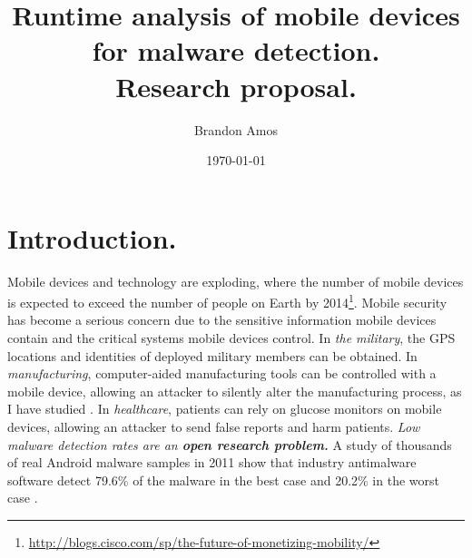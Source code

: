 \documentclass[12pt]{article}
\title{Runtime analysis of mobile devices for malware detection. \\
  {\large Research proposal.}}
\author{Brandon Amos}
\date{\today}
\begin{document}
\maketitle

\section{Introduction.}
Mobile devices and technology are exploding,
where the number of mobile devices
is expected to exceed the number of people on Earth by
2014\footnote{\url{http://blogs.cisco.com/sp/the-future-of-monetizing-mobility/}}.
Mobile security has become a serious concern due to the sensitive
information mobile devices contain and the critical systems mobile
devices control. %
In {\it the military}, the GPS locations and identities of
deployed military members can be obtained.
In {\it manufacturing}, computer-aided manufacturing tools can be
controlled with a mobile device,
allowing an attacker to silently alter the manufacturing process,
as I have studied \cite{turner2013bad}.
In {\it healthcare}, patients can rely on glucose monitors on
mobile devices, allowing an attacker to send false reports and harm patients.
\textit{Low malware detection rates are an \textbf{open research problem.}}
A study of thousands of real Android malware samples in 2011 show
that industry antimalware software detect
79.6\% of the malware in the best case and
20.2\% in the worst case \cite{zhou2012dissecting}.

\newpage


\end{document}
